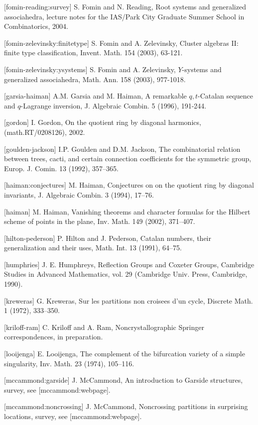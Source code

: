 \documentclass[12pt,letterpaper, reqno]{amsart}
\begin{document}
[fomin-reading:survey]
S. Fomin and N. Reading, Root systems and generalized associahedra, lecture notes for the IAS/Park City Graduate Summer School in Combinatorics, 2004.

[fomin-zelevinsky:finitetype]
S. Fomin and A. Zelevinsky, Cluster algebras II: finite type classification, Invent. Math. {154} (2003), 63-121.

[fomin-zelevinsky:ysystems]
S. Fomin and A. Zelevinsky, $Y$-systems and generalized associahedra, Math. Ann. {158} (2003), 977-1018.

[garsia-haiman]
A.M. Garsia and M. Haiman, A remarkable $q,t$-Catalan sequence and $q$-Lagrange inversion, J. Algebraic Combin. {5} (1996), 191-244.

[gordon]
I. Gordon, On the quotient ring by diagonal harmonics, (math.RT/0208126), 2002.

[goulden-jackson]
I.P. Goulden and D.M. Jackson, The combinatorial relation between trees, cacti, and certain connection coefficients for the symmetric group, Europ. J. Comin. {13} (1992), 357--365.

[haiman:conjectures]
M. Haiman, Conjectures on  on the quotient ring by diagonal invariants, J. Algebraic Combin. {3} (1994), 17--76.

[haiman]
M. Haiman, Vanishing theorems and character formulas for the Hilbert scheme of points in the plane, Inv. Math. {149} (2002), 371--407.

[hilton-pederson]
P. Hilton and J. Pederson, Catalan numbers, their generalization and their uses, Math. Int. {13} (1991), 64--75.

[humphries]
J. E. Humphreys, Reflection Groups and Coxeter Groups, Cambridge Studies in Advanced Mathematics, vol. 29 (Cambridge Univ. Press, Cambridge, 1990).

[kreweras]
G. Kreweras, Sur les partitions non croisees d'un cycle, Discrete Math. {1} (1972), 333--350.

[kriloff-ram]
C. Kriloff and A. Ram, Noncrystallographic Springer correspondences, in preparation.

[looijenga]
E. Looijenga, The complement of the bifurcation variety of a simple singularity, Inv. Math. {23} (1974), 105--116.

[mccammond:garside]
J. McCammond, An introduction to Garside structures, survey, see [mccammond:webpage].

[mccammond:noncrossing]
J. McCammond, Noncrossing partitions in surprising locations, survey, see [mccammond:webpage].
\end{document}
